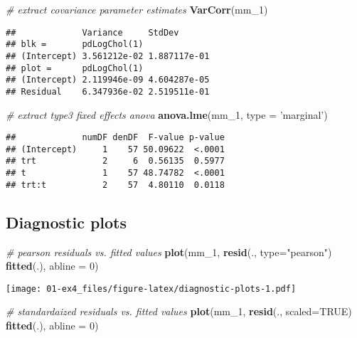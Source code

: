 \documentclass[]{book}
\newenvironment{Shaded}{\begin{snugshade}}{\end{snugshade}}
\newcommand{\CommentTok}[1]{\textcolor[rgb]{0.56,0.35,0.01}{\textit{#1}}}
\newcommand{\DataTypeTok}[1]{\textcolor[rgb]{0.13,0.29,0.53}{#1}}
\newcommand{\DecValTok}[1]{\textcolor[rgb]{0.00,0.00,0.81}{#1}}
\newcommand{\KeywordTok}[1]{\textcolor[rgb]{0.13,0.29,0.53}{\textbf{#1}}}
\newcommand{\NormalTok}[1]{#1}
\newcommand{\OperatorTok}[1]{\textcolor[rgb]{0.81,0.36,0.00}{\textbf{#1}}}
\newcommand{\OtherTok}[1]{\textcolor[rgb]{0.56,0.35,0.01}{#1}}
\newcommand{\StringTok}[1]{\textcolor[rgb]{0.31,0.60,0.02}{#1}}
\begin{document}
\begin{Shaded}
\begin{Highlighting}[]
\CommentTok{# extract covariance parameter estimates}
\KeywordTok{VarCorr}\NormalTok{(mm_}\DecValTok{1}\NormalTok{)}
\end{Highlighting}
\end{Shaded}

\begin{verbatim}
##             Variance     StdDev      
## blk =       pdLogChol(1)             
## (Intercept) 3.561212e-02 1.887117e-01
## plot =      pdLogChol(1)             
## (Intercept) 2.119946e-09 4.604287e-05
## Residual    6.347936e-02 2.519511e-01
\end{verbatim}

\begin{Shaded}
\begin{Highlighting}[]
\CommentTok{# extract type3 fixed effects anova}
\KeywordTok{anova.lme}\NormalTok{(mm_}\DecValTok{1}\NormalTok{, }\DataTypeTok{type =} \StringTok{'marginal'}\NormalTok{)}
\end{Highlighting}
\end{Shaded}

\begin{verbatim}
##             numDF denDF  F-value p-value
## (Intercept)     1    57 50.09622  <.0001
## trt             2     6  0.56135  0.5977
## t               1    57 48.74782  <.0001
## trt:t           2    57  4.80110  0.0118
\end{verbatim}

\hypertarget{diagnostic-plots}{%
\subsection{Diagnostic plots}\label{diagnostic-plots}}

\begin{Shaded}
\begin{Highlighting}[]
\CommentTok{# pearson residuals vs. fitted values}
\KeywordTok{plot}\NormalTok{(mm_}\DecValTok{1}\NormalTok{, }\KeywordTok{resid}\NormalTok{(., }\DataTypeTok{type=}\StringTok{"pearson"}\NormalTok{) }\OperatorTok{~}\StringTok{ }\KeywordTok{fitted}\NormalTok{(.), }\DataTypeTok{abline =} \DecValTok{0}\NormalTok{)}
\end{Highlighting}
\end{Shaded}

\texttt{[image: 01-ex4\_files/figure-latex/diagnostic-plots-1.pdf]}

\begin{Shaded}
\begin{Highlighting}[]
\CommentTok{# standardaized residuals vs. fitted values}
\KeywordTok{plot}\NormalTok{(mm_}\DecValTok{1}\NormalTok{, }\KeywordTok{resid}\NormalTok{(., }\DataTypeTok{scaled=}\OtherTok{TRUE}\NormalTok{) }\OperatorTok{~}\StringTok{ }\KeywordTok{fitted}\NormalTok{(.), }\DataTypeTok{abline =} \DecValTok{0}\NormalTok{)}
\end{Highlighting}
\end{Shaded}
\end{document}
